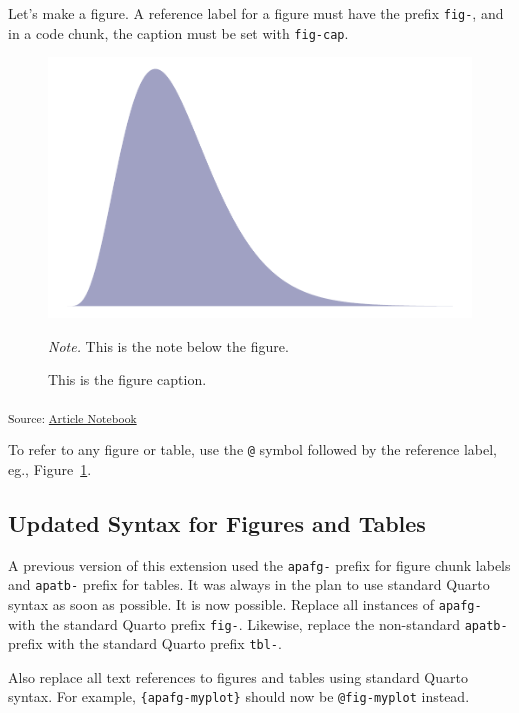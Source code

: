 \documentclass[
  man,
  floatsintext,
  longtable,
  nolmodern,
  notxfonts,
  notimes,
  mask,
  colorlinks=true,linkcolor=blue,citecolor=blue,urlcolor=blue]{apa7}
\begin{document}
Let's make a figure. A reference label for a figure must have the prefix
\texttt{fig-}, and in a code chunk, the caption must be set with
\texttt{fig-cap}.

\label{cell-fig-myplot}
\begin{figure}[H]

{\caption{{This is the figure caption.}{\label{fig-myplot}}}}

\includegraphics{index_files/figure-pdf/fig-myplot-1.pdf}

{\noindent \emph{Note.} This is the note below the figure.}

\end{figure}

\textsubscript{Source:
\href{https://mavrxlab.github.io/project-template/index.qmd.html}{Article
Notebook}}

To refer to any figure or table, use the \texttt{@} symbol followed by
the reference label, eg., Figure~\ref{fig-myplot}.

\subsection{Updated Syntax for Figures and
Tables}\label{updated-syntax-for-figures-and-tables}

A previous version of this extension used the \texttt{apafg-} prefix for
figure chunk labels and \texttt{apatb-} prefix for tables. It was always
in the plan to use standard Quarto syntax as soon as possible. It is now
possible. Replace all instances of \texttt{apafg-} with the standard
Quarto prefix \texttt{fig-}. Likewise, replace the non-standard
\texttt{apatb-} prefix with the standard Quarto prefix \texttt{tbl-}.

Also replace all text references to figures and tables using standard
Quarto syntax. For example, \texttt{\{apafg-myplot\}} should now be
\texttt{@fig-myplot} instead.
\end{document}
